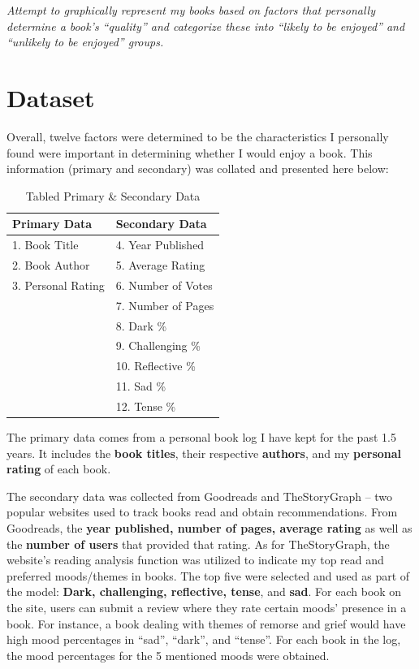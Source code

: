 \documentclass[12pt]{article}
\begin{document}
\textit{Attempt to graphically represent my books based on factors that personally determine a book’s “quality” and categorize these into “likely to be enjoyed” and “unlikely to be enjoyed” groups.}

\section{Dataset}
Overall, twelve factors were determined to be the characteristics I personally found were
important in determining whether I would enjoy a book. This information (primary and
secondary) was collated and presented here below:


\begin{table}[!htbp]
    \centering
    \begin{tabular}{|p{7cm}|p{7cm}|}
        \hline
        \textbf{Primary Data} & \textbf{Secondary Data}\\
        \hline
        1. Book Title & 4. Year Published \\
        2. Book Author & 5. Average Rating \\
        3. Personal Rating & 6. Number of Votes \\
        & 7. Number of Pages \\
        & 8. Dark \% \\
		& 9. Challenging \% \\
		& 10. Reflective \% \\
		& 11. Sad \% \\
		& 12. Tense \% \\
        \hline
    \end{tabular}
    \caption{Tabled Primary \& Secondary Data}
\end{table}

The primary data comes from a personal book log I have kept for the past 1.5 years. It
includes the \textbf{book titles}, their respective \textbf{authors}, and my \textbf{personal rating} of each book.

The secondary data was collected from Goodreads and TheStoryGraph -- two popular
websites used to track books read and obtain recommendations. From Goodreads, the \textbf{year
published, number of pages, average rating} as well as the \textbf{number of users} that
provided that rating. As for TheStoryGraph, the website's reading analysis function was
utilized to indicate my top read and preferred moods/themes in books. The top five were
selected and used as part of the model: \textbf{Dark, challenging, reflective, tense}, and \textbf{sad}. For
each book on the site, users can submit a review where they rate certain moods' presence in
a book. For instance, a book dealing with themes of remorse and grief would have high
mood percentages in “sad”, “dark”, and “tense”. For each book in the log, the mood
percentages for the 5 mentioned moods were obtained.
\end{document}
